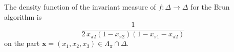 The density function of the invariant measure of $f:\Delta\to\Delta$ for
the Brun algorithm is
\[
\frac{1}{2\,x_{\pi 2}(1-x_{\pi 2})(1-x_{\pi 1}-x_{\pi 2})}
\]
on the part $\mathbf{x}=(x_1,x_2,x_3)\in\Lambda_\pi\cap\Delta$.
